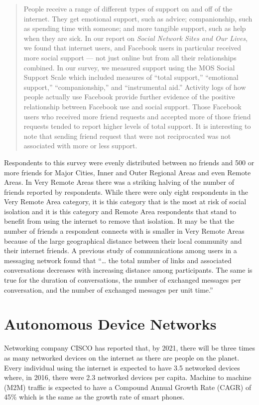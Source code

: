 \begin{quotation}
People receive a range of different types of support on and off of the internet. They get
emotional support, such as advice; companionship, such as spending time with someone; and
more tangible support, such as help when they are sick. In our report on \emph{Social Network Sites
and Our Lives}, we found that internet users, and Facebook users in particular received more
social support --- not just online but from all their relationships combined.
In our survey, we measured support using the MOS Social Support Scale which included
measures of ``total support,'' ``emotional support,'' ``companionship,'' and ``instrumental aid.''
Activity logs of how people actually use Facebook provide further evidence of the positive
relationship between Facebook use and social support. Those
Facebook users who received more friend requests and accepted more of those friend requests
tended to report higher levels of total support. It is interesting to note that sending friend
request that were not reciprocated was not associated with more or less support\cite[p24]{RefWorks:364}.
\end{quotation}

Respondents to this survey were evenly distributed between no friends and 500 or more friends for Major Cities, Inner and Outer Regional Areas and even Remote Areas. In Very Remote Areas there was a striking halving of the number of friends reported by respondents. While there were only eight respondents in the Very Remote Area category, it is this category that is the most at risk of social isolation and it is this category and Remote Area respondents that stand to benefit from using the internet to remove that isolation. It may be that the number of friends a respondent connects with is smaller in Very Remote Areas because of the large geographical distance between their local community and their internet friends. A previous study of communications among users in a messaging network found that ``\ldots{} the total number of links and associated conversations decreases with increasing distance among participants. The same is true for the duration of conversations, the number of exchanged messages per conversation, and the number of exchanged messages per unit time\cite[p18]{RefWorks:319}.''





\section{Autonomous Device Networks}
Networking company CISCO has reported that, by 2021, there will be three times as many networked devices on the internet as there are people on the planet. Every individual using the internet is expected to have 3.5 networked devices where, in 2016, there were 2.3 networked devices per capita. Machine to machine (M2M) traffic is expected to have a Compound Annual Growth Rate (CAGR) of 45\% which is the same as the growth rate of smart phones\cite{RefWorks:346}.

